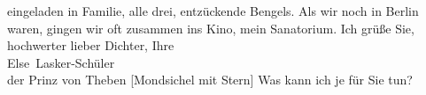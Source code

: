 \begin{ledgroupsized}[t]{13cm}
               eingeladen in Familie, alle drei, entzückende Bengels. Als wir noch in Berlin waren, gingen wir oft zusammen ins Kino,
               mein Sanatorium. Ich grüße Sie, hochwerter lieber Dichter, Ihre {\\}\spacefill\mbox{Else Lasker-Schüler}{ }{\\}der Prinz von Theben {[}Mondsichel mit
                  Stern{]}\pend
           \pstart
           \noindent{}Was kann ich je für Sie tun?\pend
           \pstart
           {\pb}\label{T_L02653-1v}\label{T_L02653-1h}\pend
           \endnumbering{}\end{ledgroupsized}  \newcommand{\dateiname}{L02653}\newcommand{\titel}{Else Lasker-Schüler an Arthur Schnitzler, 10. 12. 1924}\newcommand{\editorInnen}{Martin Anton Müller und Laura Untner}
            \footnotesize
\begin{ledgroupsized}[t]{11.5cm}
\end{ledgroupsized}
         
      